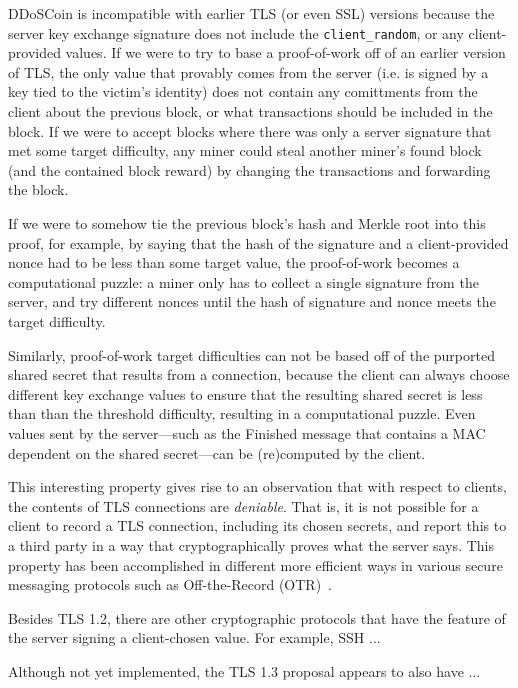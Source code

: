 DDoSCoin is incompatible with earlier TLS (or even SSL) versions because the
server key exchange signature does not include the \texttt{client\_random}, or
any client-provided values. If we were to try to base a proof-of-work off of an
earlier version of TLS, the only value that provably comes from the server (i.e.
is signed by a key tied to the victim's identity) does not contain any
comittments from the client about the previous block, or what transactions
should be included in the block. If we were to accept blocks where there was
only a server signature that met some target difficulty, any miner could steal
another miner's found block (and the contained block reward) by changing the
transactions and forwarding the block.

If we were to somehow tie the previous block's hash and Merkle root into this
proof, for example, by saying that the hash of the signature and a
client-provided nonce had to be less than some target value, the proof-of-work becomes
a computational puzzle: a miner only has to collect a single signature from
the server, and try different nonces until the hash of signature and nonce meets
the target difficulty.

Similarly, proof-of-work target difficulties can not be based off of the
purported shared secret that results from a connection, because the client can
always choose different key exchange values to ensure that the resulting shared
secret is less than than the threshold difficulty, resulting in a computational
puzzle. Even values sent by the server---such as the Finished message that
contains a MAC dependent on the shared secret---can be (re)computed by the client.

This interesting property gives rise to an observation that with respect to
clients, the contents of TLS connections are \emph{deniable}. That is, it is not
possible for a client to record a TLS connection, including its chosen secrets,
and report this to a third party in a way that cryptographically proves what the
server says. This property has been accomplished in different more efficient ways in various
secure messaging protocols such as Off-the-Record (OTR)~\cite{otr}.

Besides TLS 1.2, there are other cryptographic protocols that have the feature
of the server signing a client-chosen value. For example, SSH ... \TK

Although not yet implemented, the TLS 1.3 proposal appears to also have ... \TK




